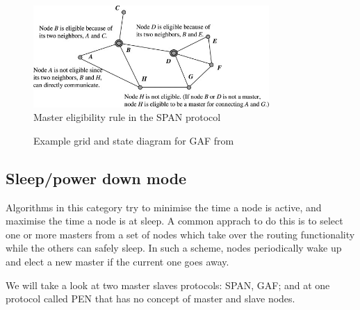 \begin{figure}
\centering
\includegraphics[width=0.8\textwidth]{images/span-master-example}
\caption{Master eligibility rule in the SPAN protocol\cite{alotaibi2012survey}}
\label{spanmaster}
\end{figure}
\begin{figure}[!t]
\hfill
{}
\caption{Example grid and state diagram for GAF from \cite{alotaibi2012survey}}
\end{figure}
\subsection{Sleep/power­ down mode}
Algorithms in this category try to minimise the time a node is active, and
maximise the time a node is at sleep. A common apprach to do this is to select
one or more masters from a set of nodes which take over the routing functionality
while the others can safely sleep. In such a scheme, nodes periodically wake up
and elect a new master if the current one goes away.

We will take a look at two master slaves protocols: SPAN, GAF;
and at one protocol called PEN that has no concept of master and slave nodes.

